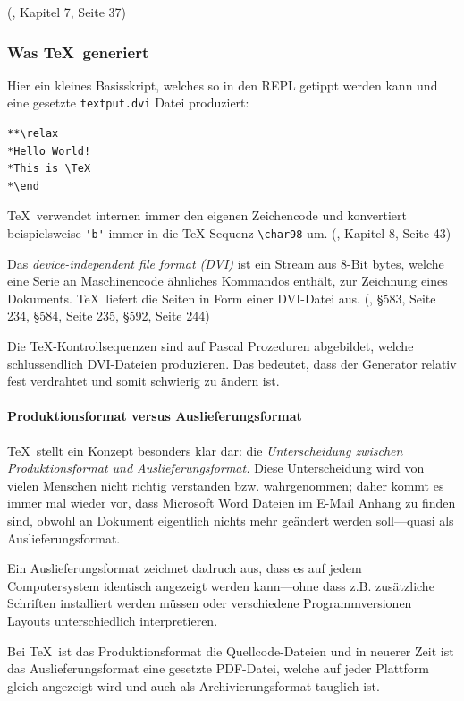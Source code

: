 (\cite{tex-a}, Kapitel 7, Seite 37)

\subsubsection{Was \TeX~generiert}

Hier ein kleines Basisskript, welches so in den REPL getippt werden kann und
eine gesetzte \lstinline|textput.dvi| Datei produziert:

\begin{verbatim}
**\relax
*Hello World!
*This is \TeX
*\end
\end{verbatim}

\TeX~verwendet internen immer den eigenen Zeichencode und konvertiert beispielsweise
\lstinline|'b'| immer in die \TeX-Sequenz \lstinline|\char98| um.
(\cite{tex-a}, Kapitel 8, Seite 43)

Das \emph{device-independent file format (DVI)} ist ein Stream aus
8-Bit bytes, welche eine Serie an
Maschinencode ähnliches Kommandos enthält, zur Zeichnung eines Dokuments.
\TeX~liefert die Seiten in Form einer DVI-Datei aus.
(\cite{tex-b}, §583, Seite 234, §584, Seite 235, §592, Seite 244)

Die \TeX-Kontrollsequenzen sind auf Pascal Prozeduren abgebildet,
welche schlussendlich DVI-Dateien produzieren. Das bedeutet, dass der Generator
relativ fest verdrahtet und somit schwierig zu ändern ist.

\paragraph{Produktionsformat versus Auslieferungsformat}

\TeX~stellt ein Konzept besonders klar dar: die \emph{Unterscheidung
zwischen Produktionsformat und Auslieferungsformat.} Diese Unterscheidung
wird von vielen Menschen nicht richtig verstanden bzw. wahrgenommen; daher kommt
es immer mal wieder vor, dass Microsoft Word Dateien im E-Mail Anhang zu
finden sind, obwohl an Dokument eigentlich nichts mehr geändert werden
soll---quasi als Auslieferungsformat.

Ein Auslieferungsformat zeichnet dadruch aus, dass es auf jedem
Computersystem identisch angezeigt werden kann---ohne dass z.B. zusätzliche
Schriften installiert werden müssen oder verschiedene Programmversionen
Layouts unterschiedlich interpretieren.

Bei \TeX~ist das Produktionsformat die Quellcode-Dateien und in neuerer
Zeit ist das Auslieferungsformat eine gesetzte PDF-Datei, welche auf jeder
Plattform gleich angezeigt wird und auch als Archivierungsformat tauglich
ist.
